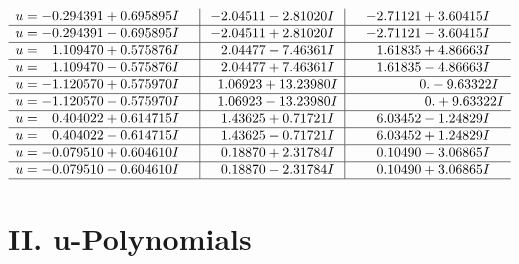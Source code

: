 \documentclass[1p]{elsarticle_modified}
\theoremstyle{definition}
\begin{document}
$$\begin{array}{c|c|c}
\begin{aligned}
u &= -0.294391 + 0.695895 I\end{aligned}
 & -2.04511 - 2.81020 I & -2.71121 + 3.60415 I \\ \hline\begin{aligned}
u &= -0.294391 - 0.695895 I\end{aligned}
 & -2.04511 + 2.81020 I & -2.71121 - 3.60415 I \\ \hline\begin{aligned}
u &= \phantom{-}1.109470 + 0.575876 I\end{aligned}
 & \phantom{-}2.04477 - 7.46361 I & \phantom{-}1.61835 + 4.86663 I \\ \hline\begin{aligned}
u &= \phantom{-}1.109470 - 0.575876 I\end{aligned}
 & \phantom{-}2.04477 + 7.46361 I & \phantom{-}1.61835 - 4.86663 I \\ \hline\begin{aligned}
u &= -1.120570 + 0.575970 I\end{aligned}
 & \phantom{-}1.06923 + 13.23980 I & \phantom{-0.000000 } 0. - 9.63322 I \\ \hline\begin{aligned}
u &= -1.120570 - 0.575970 I\end{aligned}
 & \phantom{-}1.06923 - 13.23980 I & \phantom{-0.000000 -}0. + 9.63322 I \\ \hline\begin{aligned}
u &= \phantom{-}0.404022 + 0.614715 I\end{aligned}
 & \phantom{-}1.43625 + 0.71721 I & \phantom{-}6.03452 - 1.24829 I \\ \hline\begin{aligned}
u &= \phantom{-}0.404022 - 0.614715 I\end{aligned}
 & \phantom{-}1.43625 - 0.71721 I & \phantom{-}6.03452 + 1.24829 I \\ \hline\begin{aligned}
u &= -0.079510 + 0.604610 I\end{aligned}
 & \phantom{-}0.18870 + 2.31784 I & \phantom{-}0.10490 - 3.06865 I \\ \hline\begin{aligned}
u &= -0.079510 - 0.604610 I\end{aligned}
 & \phantom{-}0.18870 - 2.31784 I & \phantom{-}0.10490 + 3.06865 I\\
 \hline 
 \end{array}$$\newpage
\newpage\renewcommand{\arraystretch}{1}
\centering \section*{ II. u-Polynomials}
\end{document}
